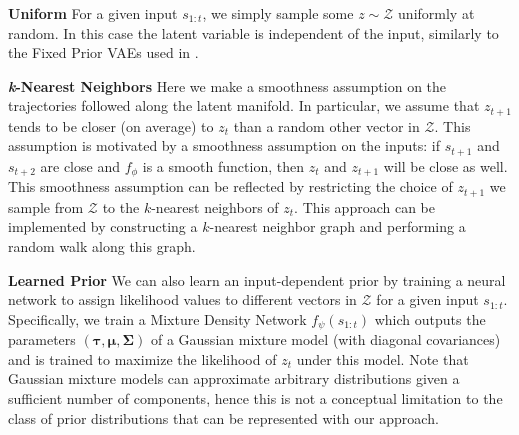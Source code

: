 \documentclass{article}
\begin{document}


\textbf{Uniform} \quad
For a given input $s_{1:t}$, we simply sample some $z \sim \mathcal{Z}$ uniformly at random. In this case the latent variable is independent of the input, similarly to the Fixed Prior VAEs used in \citep{Denton18}.

\textbf{\emph{k}-Nearest Neighbors} \quad
Here we make a smoothness assumption on the trajectories followed along the latent manifold.
In particular, we assume that $z_{t+1}$ tends to be closer (on average) to $z_t$ than a random other vector in $\mathcal{Z}$.
This assumption is motivated by a smoothness assumption on the inputs: if $s_{t+1}$ and $s_{t+2}$ are close and $f_\phi$ is a smooth function, then $z_t$ and $z_{t+1}$ will be close as well.
This smoothness assumption can be reflected by restricting the choice of $z_{t+1}$ we sample from $\mathcal{Z}$ to the $k$-nearest neighbors of $z_t$.
This approach can be implemented by constructing a $k$-nearest neighbor graph and performing a random walk along this graph.

\textbf{Learned Prior} \quad
We can also learn an input-dependent prior by training a neural network to assign likelihood values to different vectors in $\mathcal{Z}$ for a given input $s_{1:t}$.
Specifically, we train a Mixture Density Network \citep{mixture-density-networks} $f_\psi(s_{1:t})$ which outputs the parameters $(\bm{\tau}, \bm{\mu}, \bm{\Sigma})$ of a Gaussian mixture model (with diagonal covariances) and is trained to maximize the likelihood of $z_t$ under this model.
Note that Gaussian mixture models can approximate arbitrary distributions given a sufficient number of components, hence this is not a conceptual limitation to the class of prior distributions that can be represented with our approach.
\end{document}
